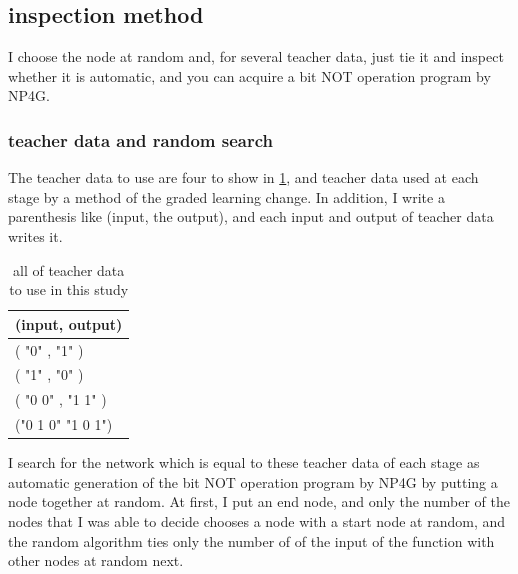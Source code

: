\documentclass{article}
\begin{document}
\subsection {inspection method}
I choose the node at random and, for several teacher data, just tie it and inspect whether it is automatic, and you can acquire a bit NOT operation program by NP4G.
\subsubsection {teacher data and random search}
The teacher data to use are four to show in \ref{tbl:TeacherData}, and teacher data used at each stage by a method of the graded learning change.
In addition, I write a parenthesis like (input, the output), and each input and output of teacher data writes it.
\begin{table}[htbp]
\centering
\caption {all of teacher data to use in this study}
\label{tbl:TeacherData}
\begin{tabular}{l}
\hline
(input, output) \\
\hline \hline
( "0" , "1" ) \\
( "1" , "0" ) \\
( "0 0" , "1 1" ) \\
("0 1 0" "1 0 1") \\
\hline
\end{tabular}
\end{table}
I search for the network which is equal to these teacher data of each stage as automatic generation of the bit NOT operation program by NP4G by putting a node together at random.
At first, I put an end node, and only the number of the nodes that I was able to decide chooses a node with a start node at random, and the random algorithm ties only the number of of the input of the function with other nodes at random next.
\end{document}
